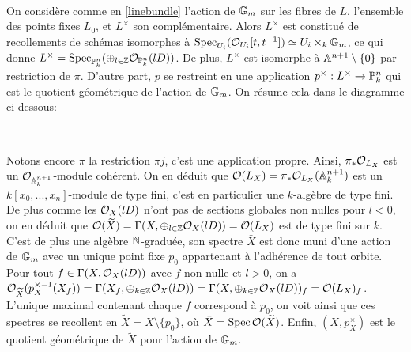 	\begin{center}
	\\
	\end{center}


On considère comme en \ref{linebundle} l'action de $\mathbb{G}_m$ sur les fibres de $L$, l'ensemble des points fixes $L_0$, et $L^\times$ son complémentaire. Alors $L^\times$ est constitué de recollements de schémas isomorphes à $\operatorname{Spec}_{U_i}( \mathcal{O}_{U_i}[t,t^{-1}])\simeq U_i \times_k \mathbb{G}_m$, ce qui donne $L^\times=\operatorname{Spec}_{\mathbb{P}^n_k}(\oplus_{l\in \mathbb{Z}}\mathcal{O}_{\mathbb{P}^n_k}(lD))$. De plus, $L^\times$ est isomorphe à $\mathbb{A}^{n+1}\setminus\lbrace 0 \rbrace$ par restriction de $\pi$. D'autre part, $p$ se restreint en une application $p^\times:L^\times \rightarrow \mathbb{P}^n_k$ qui est le quotient géométrique de l'action de $\mathbb{G}_m$. On résume cela dans le diagramme ci-dessous:

	\begin{center}
	\\
	\end{center}

Notons encore $\pi$ la restriction $\pi j$, c'est une application propre. Ainsi, $\pi_*\mathcal{O}_{L_X}$ est un $\mathcal{O}_{\mathbb{A}_k^{n+1}}$-module cohérent. On en déduit que $\mathcal{O}(L_X)=\pi_*\mathcal{O}_{L_X}(\mathbb{A}_k^{n+1})$ est un $k[x_0,...,x_n]$-module de type fini, c'est en particulier une $k$-algèbre de type fini. De plus comme les $\mathcal{O}_X(lD)$ n'ont pas de sections globales non nulles pour $l<0$, on en déduit que $\mathcal{O}(\widetilde{X})=\Gamma(X,\oplus_{l\in \mathbb{Z}}\mathcal{O}_X(lD))=\mathcal{O}(L_X)$ est de type fini sur $k$. C'est de plus une algèbre $\mathbb{N}$-graduée, son spectre $\bar{X}$ est donc muni d'une action de $\mathbb{G}_m$ avec un unique point fixe $p_0$ appartenant à l'adhérence de tout orbite. Pour tout $f\in \Gamma(X,\mathcal{O}_X(lD))$ avec $f$ non nulle et $l>0$, on a  $\mathcal{O}_{\widetilde{X}}(p_X^{\times-1}(X_f))=\Gamma(X_f,\oplus_{k\in \mathbb{Z}}\mathcal{O}_X(lD))=\Gamma(X,\oplus_{k\in \mathbb{Z}}\mathcal{O}_X(lD))_f=\mathcal{O}(L_X)_f$. L'unique maximal contenant chaque $f$ correspond à $p_0$, on voit ainsi que ces spectres se recollent en $\widetilde{X}=\bar{X}\setminus \lbrace p_0 \rbrace$, où $\bar{X}=\operatorname{Spec}\mathcal{O}(\widetilde{X})$. Enfin, $(X,p^\times_X)$ est le quotient géométrique de $\widetilde{X}$ pour l'action de $\mathbb{G}_m$.\\

